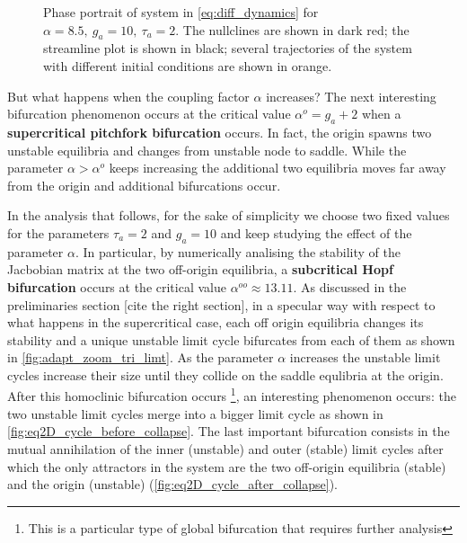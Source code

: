 \begin{figure}[H]
        \caption{\label{fig:eq2D_cycle} Phase portrait of system in \eqref{eq:diff_dynamics} for $\alpha=8.5,\ g_a=10,\ \tau_a=2$. The nullclines are shown in dark red; the streamline plot is shown in black; several trajectories of the system with different initial conditions are shown in orange.}
\end{figure}

But what happens when the coupling factor $\alpha$ increases? The next interesting bifurcation phenomenon occurs at the critical value $\alpha^o = g_a + 2$ when a \textbf{supercritical pitchfork bifurcation} occurs. In fact, the origin spawns two unstable equilibria and changes from unstable node to saddle. While the parameter $\alpha > \alpha^o$ keeps increasing the additional two equilibria moves far away from the origin and additional bifurcations occur.

In the analysis that follows, for the sake of simplicity we choose two fixed values for the parameters $\tau_a=2$ and $g_a=10$ and keep studying the effect of the parameter $\alpha$.
In particular, by numerically analising the stability of the Jacbobian matrix at the two off-origin equilibria, a \textbf{subcritical Hopf bifurcation} occurs at the critical value $\alpha^{oo} \approx 13.11$. As discussed in the preliminaries section [cite the right section], in a specular way with respect to what happens in the supercritical case, each off origin equilibria changes its stability and a unique unstable limit cycle bifurcates from each of them as shown in \cref{fig:adapt_zoom_tri_limt}. As the parameter $\alpha$ increases the unstable limit cycles increase their size until they collide on the saddle equlibria at the origin. After this homoclinic bifurcation occurs \footnote{This is a particular type of global bifurcation that requires further analysis},
 an interesting phenomenon occurs: the two unstable limit cycles merge into a bigger limit cycle as shown in \cref{fig:eq2D_cycle_before_collapse}. The last important bifurcation consists in the mutual annihilation of the inner (unstable) and outer (stable) limit cycles after which the only attractors in the system are the two off-origin equilibria (stable) and the origin (unstable) (\cref{fig:eq2D_cycle_after_collapse}).

